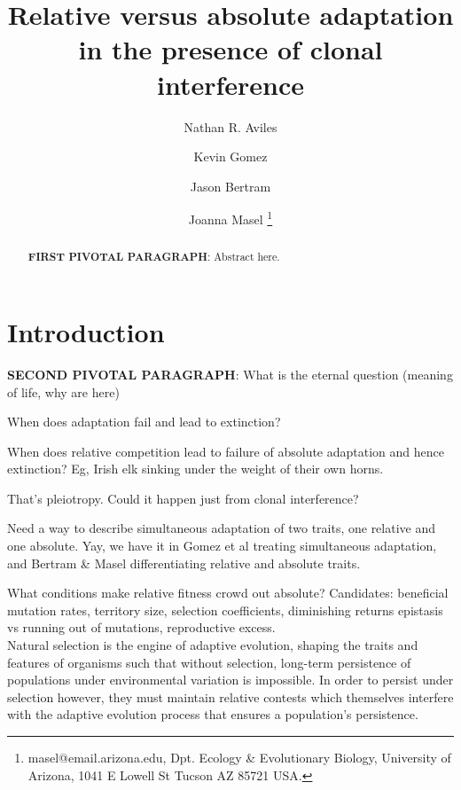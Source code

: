 \documentclass[9pt,twocolumn,twoside]{article}
\begin{document}
\title{Relative versus absolute adaptation in the presence of clonal interference}
\author[$\ast$]{Nathan R. Aviles}
\author[$\ast$]{Kevin Gomez}
\author[$\dagger$]{Jason Bertram}
\author[,$\ddagger$]{Joanna Masel \thanks{masel@email.arizona.edu, Dpt. Ecology \& Evolutionary Biology, University of Arizona, 1041 E Lowell St Tucson AZ 85721 USA.}}
 \maketitle
\begin{abstract}
\textbf{FIRST PIVOTAL PARAGRAPH}: Abstract here.
\end{abstract}

\section{Introduction} \label{sec:introduction}
\textbf{SECOND PIVOTAL PARAGRAPH}: What is the eternal question (meaning of life, why are here)

When does adaptation fail and lead to extinction?

When does relative competition lead to failure of absolute adaptation and hence extinction? Eg, Irish elk sinking under the weight of their own horns.

That's pleiotropy. Could it happen just from clonal interference?

Need a way to describe simultaneous adaptation of two traits, one relative and one absolute. Yay, we have it in Gomez et al treating simultaneous adaptation, and Bertram \& Masel differentiating relative and absolute traits.

What conditions make relative fitness crowd out absolute? Candidates: beneficial mutation rates, territory size, selection coefficients, diminishing returns epistasis vs running out of mutations, reproductive excess. \\

Natural selection is the engine of adaptive evolution, shaping the traits and features of organisms such that without selection, long-term persistence of populations under environmental variation is impossible. In order to persist under selection however, they must maintain relative contests which themselves interfere with the adaptive evolution process that ensures a population's persistence.
\end{document}
